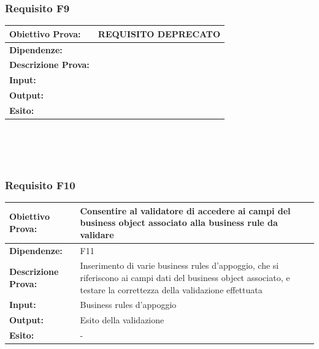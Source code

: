 \documentclass[11pt,titlepage,a4paper]{report}
\begin{document}
\subsubsection{Requisito F9}
\begin{tabular}{||p{4.5cm}||p{7.5cm}||}
\hline
{\textbf {Obiettivo Prova:}}& REQUISITO DEPRECATO\\ \hline
{\textbf{Dipendenze:}}& \\ \hline
{\textbf{Descrizione Prova:}}& \\ \hline
{\textbf{Input:}}& \\ \hline
{\textbf{Output:}}&  \\ \hline
{\textbf{Esito:}}&  \\ \hline
\end{tabular} \\
\\
\\
\subsubsection{Requisito F10}
\begin{tabular}{||p{4.5cm}||p{7.5cm}||}
\hline
{\textbf {Obiettivo Prova:}}& Consentire al validatore di accedere ai campi del business object associato alla business rule da validare \\ \hline
{\textbf{Dipendenze:}}& F11\\ \hline
{\textbf{Descrizione Prova:}}&  Inserimento di varie business rules d'appoggio, che si riferiscono ai campi dati del business object associato, e testare la correttezza della validazione effettuata \\ \hline
{\textbf{Input:}}&  Business rules d'appoggio \\ \hline
{\textbf{Output:}}& Esito della validazione \\ \hline
{\textbf{Esito:}}& -  \\ \hline
\end{tabular} \\
\\
\\
\end{document}

